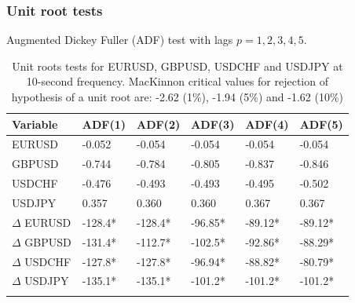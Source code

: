 \documentclass{beamer}
\begin{document}
%
%
\begin{frame}
\frametitle{Unit root tests}
Augmented Dickey Fuller (ADF) test with lags $p=1,2,3,4,5$.
\begin{table}[ht]
\centering
\tiny
\begin{tabular}{llllll}
\toprule
{Variable} & {ADF(1)} & {ADF(2)} & {ADF(3)} & {ADF(4)} & {ADF(5)}\\ 
\midrule
EURUSD &  -0.052   & -0.054  & -0.054  & -0.054  & -0.054  \\
GBPUSD &  -0.744  & -0.784  & -0.805  & -0.837  & -0.846  \\
USDCHF &  -0.476   & -0.493  & -0.493  & -0.495  & -0.502  \\
USDJPY &  0.357   & 0.360  & 0.360  & 0.367  & 0.367  \\
$\Delta$ EURUSD & -128.4*  & -128.4*  & -96.85* & -89.12*   & -89.12*\\
$\Delta$ GBPUSD & -131.4*  & -112.7*  & -102.5* & -92.86*   & -88.29*\\
$\Delta$ USDCHF & -127.8*  & -127.8*  & -96.94* & -88.82*   & -80.79*\\
$\Delta$ USDJPY & -135.1*  & -135.1*  & -101.2* & -101.2*   & -101.2*\\
\bottomrule
\addlinespace[1ex]
\end{tabular}
\caption{Unit roots tests for EURUSD, GBPUSD, USDCHF and USDJPY at 10-second
frequency. MacKinnon critical values for rejection of hypothesis of a unit root are: -2.62 (1\%), -1.94 (5\%) and -1.62 (10\%)}
\label{tab:adf}
\end{table}
\end{frame}
\end{document}
